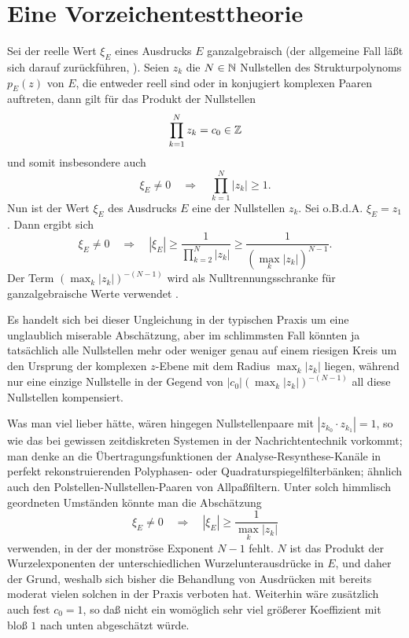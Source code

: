 %
%
%
\pagebreak
\section{Eine Vorzeichentesttheorie}


\begin{remark}[Aufgabenstellung]\label{re:Aufgabenstellung}
Sei der reelle Wert $\xi_E$ eines Ausdrucks $E$ ganzalgebraisch
(der allgemeine Fall läßt sich darauf zurückführen, \cite{BFMS, BFMSS}).
Seien $z_k$ die $N\in\mathbb{N}$ Nullstellen
des Strukturpolynoms $p_E(z)$ von $E$,
die entweder reell sind 
oder in konjugiert komplexen Paaren auftreten,
dann gilt für das Produkt der Nullstellen
\begin{equation*}
  \prod_{k=1}^N z_k = c_0 \in \mathbb{Z}
\end{equation*}
und somit insbesondere auch
\begin{equation*}
  \xi_E\ne0
  \quad\Rightarrow\quad
  \prod_{k=1}^N |z_k| \ge 1.
\end{equation*}
Nun ist der Wert $\xi_E$ des Ausdrucks $E$
eine der Nullstellen $z_k$.
Sei o.B.d.A. $\xi_E = z_1$.
Dann ergibt sich
\begin{equation*}
  \xi_E\ne0
  \quad\Rightarrow\quad
  |\xi_E|
  \ge
  \frac{1}{\prod_{k=2}^N |z_k|}
  \ge
  \frac{1}{(\max_k|z_k|)^{N-1}}.
\end{equation*}
Der Term $(\max_k|z_k|)^{-(N-1)}$ wird als Nulltrennungsschranke 
für ganzalgebraische Werte verwendet \cite{BFMS}.

Es handelt sich bei dieser Ungleichung
in der typischen Praxis um eine unglaublich miserable Abschätzung,
aber im schlimmsten Fall könnten ja tatsächlich alle Nullstellen
mehr oder weniger genau auf einem riesigen Kreis 
um den Ursprung der komplexen $z$-Ebene
mit dem Radius $\max_k|z_k|$ liegen,
während nur eine einzige Nullstelle 
in der Gegend von $|c_0|(\max_k|z_k|)^{-(N-1)}$
all diese Nullstellen kompensiert.

Was man viel lieber hätte,
wären hingegen Nullstellenpaare mit $|z_{k_0}\cdot z_{k_1}|=1$,
 so wie das bei gewissen zeitdiskreten Systemen
 in der Nachrichtentechnik vorkommt;
 man denke an die Übertragungsfunktionen 
 der Analyse-Resynthese-Kanäle
 in perfekt rekonstruierenden Polyphasen-
 oder Quadraturspiegelfilterbänken;
 ähnlich auch den Polstellen-Nullstellen-Paaren von Allpaßfiltern.
Unter solch himmlisch geordneten Umständen könnte man die Abschätzung
\begin{equation*}
  \xi_E\ne0
  \quad\Rightarrow\quad
  |\xi_E|
  \ge
  \frac{1}{\max_k|z_k|}
\end{equation*}
verwenden, in der der monströse Exponent $N-1$ fehlt.
$N$ ist das Produkt der Wurzelexponenten 
der unterschiedlichen Wurzelunterausdrücke in $E$,
und daher der Grund,
weshalb sich bisher die Behandlung von Ausdrücken 
mit bereits moderat vielen solchen
in der Praxis verboten hat.
Weiterhin wäre zusätzlich auch fest $c_0=1$,
so daß nicht ein womöglich sehr viel größerer Koeffizient
mit bloß $1$ nach unten abgeschätzt würde.
\end{remark}


